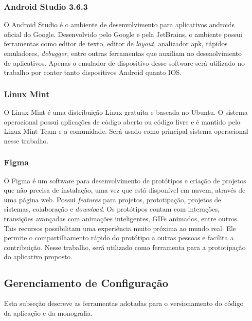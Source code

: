 \subsubsection{Android Studio 3.6.3}

O Android Studio \cite{android2020} é o ambiente de desenvolvimento para 
aplicativos androids oficial do Google. Desenvolvido pelo Google e pela 
JetBrains, o ambiente possui ferramentas como editor de texto, editor de \emph{layout}, 
analizador apk, rápidos emuladores, \emph{debugger}, entre outras ferramentas 
que auxiliam no desenolvimento de aplicativos. Apenas o emulador de dispositivo 
desse software será utilizado no trabalho por conter tanto dispositivos Android 
quanto IOS.

\subsubsection{Linux Mint}

O Linux Mint \cite{lm2020} é uma distribuição Linux gratuita e baseada no Ubuntu. O sistema operacional possui aplicações de código aberto ou código livre e é mantido pelo Linux Mint Team e a comunidade. Será usado como principal sistema operacional nesse trabalho.

\subsubsection{Figma}

O Figma \cite{figma2020} é um software para desenvolvimento de protótipos e 
criação de projetos que não precisa de instalação, uma vez que está disponível 
em nuvem, através de uma página web. Possui \emph{features} para projetos, prototipação, 
projetos de sistemas, colaboração e \emph{download}. Os protótipos contam com 
interações, transições avançadas com animações inteligentes, GIFs animados, 
entre outros. Tais recursos possibilitam uma experiência muito próxima ao mundo 
real. Ele permite o compartilhamento rápido do protótipo a outras pessoas e 
facilita a contribuição. Nesse trabalho, será utilizado como ferramenta para a 
prototipação do aplicativo proposto. 

\subsection{Gerenciamento de Configuração}

Esta subseção descreve as ferramentas adotadas para o versionamento do código da aplicação e da monografia.


